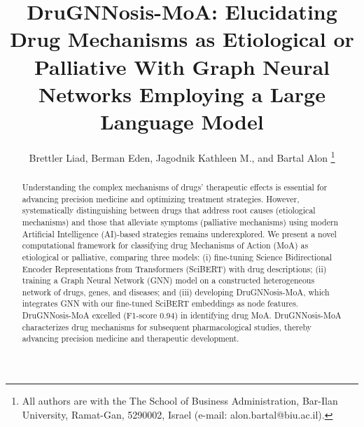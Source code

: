 \documentclass[journal,twoside,web]{ieeecolor}
\begin{document}
\title{DruGNNosis-MoA: Elucidating Drug Mechanisms as Etiological or Palliative With Graph Neural Networks Employing a Large Language Model}
\author{Brettler Liad, 
Berman Eden,
Jagodnik Kathleen M.,
and 
Bartal Alon
\thanks{
All authors are with the The School of Business Administration, Bar-Ilan University, Ramat-Gan, 5290002, Israel (e-mail: alon.bartal@biu.ac.il).}
}

\maketitle






\begin{abstract}
Understanding the complex mechanisms of drugs' therapeutic effects is essential for advancing precision medicine and optimizing treatment strategies. 
However, systematically distinguishing between drugs that address root causes (etiological mechanisms) and those that alleviate symptoms (palliative mechanisms) using modern Artificial Intelligence (AI)-based strategies remains underexplored.
We present a novel computational framework for classifying drug Mechanisms of Action (MoA) as etiological or palliative, comparing three models: 
(i) fine-tuning Science Bidirectional Encoder Representations from Transformers (SciBERT) with drug descriptions; 
(ii) training a Graph Neural Network (GNN) model on a constructed heterogeneous network of drugs, genes, and diseases; and 
(iii) developing DruGNNosis-MoA, which integrates GNN with our fine-tuned SciBERT embeddings as node features. 
DruGNNosis-MoA excelled (F1-score 0.94) in identifying drug MoA. 
DruGNNosis-MoA characterizes drug mechanisms for subsequent pharmacological studies, thereby advancing precision medicine and therapeutic development.
\end{abstract}
\end{document}
